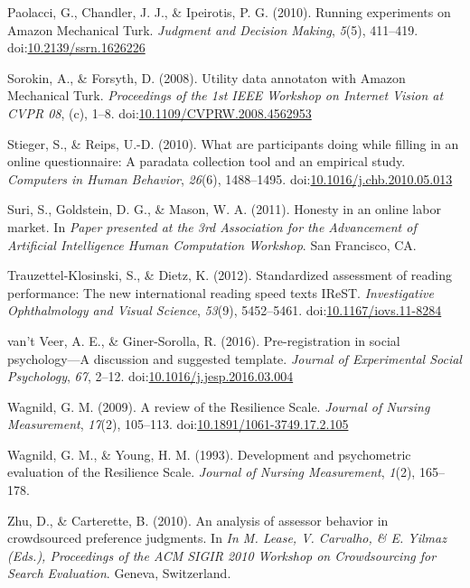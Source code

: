 \documentclass[english,man]{apa6}
\theoremstyle{definition}
\theoremstyle{definition}
\theoremstyle{definition}
\theoremstyle{remark}
\begin{document}
\hypertarget{ref-Paolacci2010}{}
Paolacci, G., Chandler, J. J., \& Ipeirotis, P. G. (2010). Running
experiments on Amazon Mechanical Turk. \emph{Judgment and Decision
Making}, \emph{5}(5), 411--419.
doi:\href{https://doi.org/10.2139/ssrn.1626226}{10.2139/ssrn.1626226}

\hypertarget{ref-Sorokin2008}{}
Sorokin, A., \& Forsyth, D. (2008). Utility data annotaton with Amazon
Mechanical Turk. \emph{Proceedings of the 1st IEEE Workshop on Internet
Vision at CVPR 08}, (c), 1--8.
doi:\href{https://doi.org/10.1109/CVPRW.2008.4562953}{10.1109/CVPRW.2008.4562953}

\hypertarget{ref-Stieger2010}{}
Stieger, S., \& Reips, U.-D. (2010). What are participants doing while
filling in an online questionnaire: A paradata collection tool and an
empirical study. \emph{Computers in Human Behavior}, \emph{26}(6),
1488--1495.
doi:\href{https://doi.org/10.1016/j.chb.2010.05.013}{10.1016/j.chb.2010.05.013}

\hypertarget{ref-Suri2011}{}
Suri, S., Goldstein, D. G., \& Mason, W. A. (2011). Honesty in an online
labor market. In \emph{Paper presented at the 3rd Association for the
Advancement of Artificial Intelligence Human Computation Workshop}. San
Francisco, CA.

\hypertarget{ref-Trauzettel-Klosinski2012}{}
Trauzettel-Klosinski, S., \& Dietz, K. (2012). Standardized assessment
of reading performance: The new international reading speed texts IReST.
\emph{Investigative Ophthalmology and Visual Science}, \emph{53}(9),
5452--5461.
doi:\href{https://doi.org/10.1167/iovs.11-8284}{10.1167/iovs.11-8284}

\hypertarget{ref-VantVeer2016}{}
van't Veer, A. E., \& Giner-Sorolla, R. (2016). Pre-registration in
social psychology---A discussion and suggested template. \emph{Journal
of Experimental Social Psychology}, \emph{67}, 2--12.
doi:\href{https://doi.org/10.1016/j.jesp.2016.03.004}{10.1016/j.jesp.2016.03.004}

\hypertarget{ref-Wagnild2009}{}
Wagnild, G. M. (2009). A review of the Resilience Scale. \emph{Journal
of Nursing Measurement}, \emph{17}(2), 105--113.
doi:\href{https://doi.org/10.1891/1061-3749.17.2.105}{10.1891/1061-3749.17.2.105}

\hypertarget{ref-Wagnild1993}{}
Wagnild, G. M., \& Young, H. M. (1993). Development and psychometric
evaluation of the Resilience Scale. \emph{Journal of Nursing
Measurement}, \emph{1}(2), 165--178.

\hypertarget{ref-Zhu2010}{}
Zhu, D., \& Carterette, B. (2010). An analysis of assessor behavior in
crowdsourced preference judgments. In \emph{In M. Lease, V. Carvalho, \&
E. Yilmaz (Eds.), Proceedings of the ACM SIGIR 2010 Workshop on
Crowdsourcing for Search Evaluation}. Geneva, Switzerland.
\end{document}
